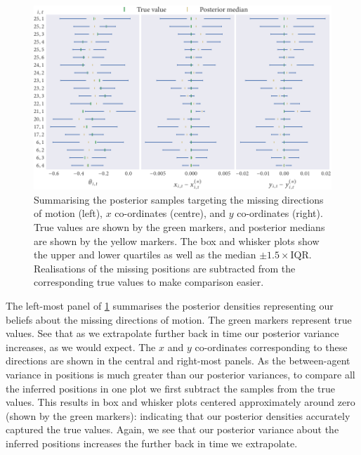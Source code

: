 \begin{figure}[tbp]
  \includegraphics{beg/summary.pdf}
  \caption{Summarising the posterior samples targeting the missing directions
  of motion (left), $x$ co-ordinates (centre), and $y$ co-ordinates (right).
  True values are shown by the green markers, and posterior medians are shown
  by the yellow markers. The box and whisker plots show the upper and lower
  quartiles as well as the median $\pm1.5\times\text{IQR}$. Realisations of the
  missing positions are subtracted from the corresponding true values to make
  comparison easier.}
  \label{fig:beg_summary}
\end{figure}

The left-most panel of \cref{fig:beg_summary} summarises the posterior
densities representing our beliefs about the missing directions of motion. The
green markers represent true values. See that as we extrapolate further back in
time our posterior variance increases, as we would expect. The $x$ and $y$
co-ordinates corresponding to these directions are shown in the central and
right-most panels. As the between-agent variance in positions is much greater
than our posterior variances, to compare all the inferred positions in one plot
we first subtract the samples from the true values. This results in box and
whisker plots centered approximately around zero (shown by the green markers):
indicating that our posterior densities accurately captured the true values.
Again, we see that our posterior variance about the inferred positions
increases the further back in time we extrapolate.

